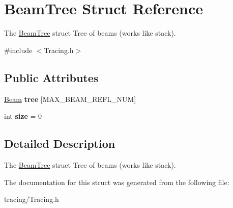 \hypertarget{struct_beam_tree}{}\section{Beam\+Tree Struct Reference}
\label{struct_beam_tree}


The \mbox{\hyperlink{struct_beam_tree}{Beam\+Tree}} struct Tree of beams (works like stack).  




{\ttfamily \#include $<$Tracing.\+h$>$}

\subsection*{Public Attributes}
\begin{DoxyCompactItemize}
\item 
\mbox{\label{struct_beam_tree_aeaf5077485c789d8317b8c6f5e351766}} 
\mbox{\hyperlink{class_beam}{Beam}} {\bfseries tree} \mbox{[}M\+A\+X\+\_\+\+B\+E\+A\+M\+\_\+\+R\+E\+F\+L\+\_\+\+N\+UM\mbox{]}
\item 
\mbox{\label{struct_beam_tree_ac1d4c414b0f572ab75eea1dd0644fb87}} 
int {\bfseries size} = 0
\end{DoxyCompactItemize}


\subsection{Detailed Description}
The \mbox{\hyperlink{struct_beam_tree}{Beam\+Tree}} struct Tree of beams (works like stack). 

The documentation for this struct was generated from the following file\+:\begin{DoxyCompactItemize}
\item 
tracing/Tracing.\+h\end{DoxyCompactItemize}
